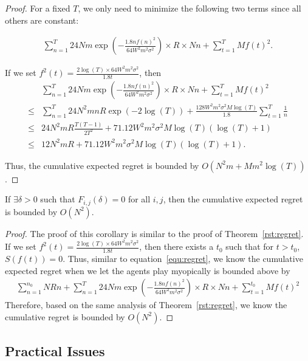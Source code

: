 \documentclass[twoside,11pt]{article}
\begin{document}
\begin{proof}
For a fixed $T$, we only need to minimize the following two terms since all others are constant:

\begin{align}
\sum_{n=1}^{T} 24Nm\exp\left(-\frac{1.8n f(n)^2}{64 W^2 m^2\sigma^2}\right)\times R \times Nn+ \sum_{t=1}^{T}Mf(t)^2. \label{equ:regret}
\end{align}


If we set $f^2(t)=\frac{2\log(T)\times 64W^2 m^2\sigma^2}{1.8t}$, then
\begin{align}
&\sum_{n=1}^{T} 24Nm\exp\left(-\frac{1.8n f(n)^2}{64 W^2 m^2\sigma^2}\right)\times R \times Nn+ \sum_{t=1}^{T}Mf(t)^2 \nonumber \\ 
\leq & \sum_{n=1}^{T} 24N^2 mnR \exp\left(-2\log(T)\right)  + \frac{128W^2 m^2\sigma^2 M\log(T)}{1.8}\sum_{t=1}^{T}\frac{1}{n} \nonumber \\
\leq &  24N^2 m R\frac{T(T-1)}{2T^2}  + 71.12 W^2 m^2\sigma^2 M\log(T)(\log(T)+1) \nonumber \\
\leq &  12 N^2 m R  + 71.12 W^2 m^2\sigma^2 M\log(T)(\log(T)+1). \nonumber
\end{align}

Thus, the cumulative expected regret is bounded by $O(N^2 m + M m^2\log(T))$.
\end{proof}

\begin{corollary}
If $\exists \delta>0$ such that $F_{i,j}(\delta)=0$ for all $i,j$, then the cumulative expected regret is bounded by $O(N^2)$.
\end{corollary}


\begin{proof}
The proof of this corollary is similar to the proof of Theorem~\ref{rst:regret}. If we set $f^2(t)=\frac{2\log(T)\times 64W^2 m^2\sigma^2}{1.8t}$, then there exists a $t_{0}$ such that for $t>t_{0}$, $S(f(t))=0$. Thus, similar to equation~\eqref{equ:regret}, we know the cumulative expected regret when we let the agents play myopically is bounded above by
\begin{align}
\sum_{n=1}^{n_{0}}NRn + \sum_{n=1}^{T} 24Nm\exp\left(-\frac{1.8n f(n)^2}{64 W^2 m^2\sigma^2}\right)\times R \times Nn+ \sum_{t=1}^{t_{0}}Mf(t)^2 \nonumber
\end{align}
Therefore, based on the same analysis of Theorem~\ref{rst:regret}, we know the cumulative regret is bounded by $O(N^2)$.
\end{proof}


\subsection{Practical Issues}
\label{sec:pi}
\end{document}

